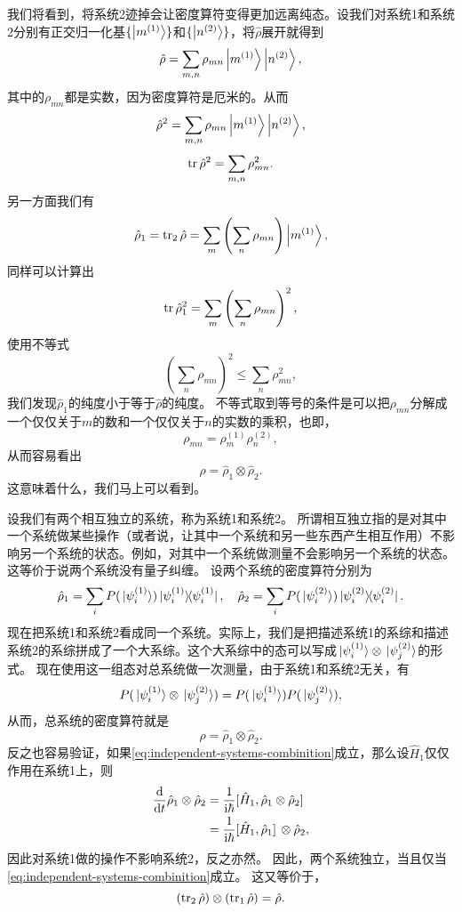 \documentclass[hyperref, UTF8, a4paper]{ctexart}
\newcommand*{\ii}{\mathrm{i}}
\begin{document}
我们将看到，将系统2迹掉会让密度算符变得更加远离纯态。设我们对系统1和系统2分别有正交归一化基$\{\ket{m^{(1)}}\}$和$\{\ket{n^{(2)}}\}$，将$\hat{\rho}$展开就得到
\[
    \hat{\rho} = \sum_{m,n} \rho_{mn} \ket{m^{(1)}} \ket{n^{(2)}},
\]
其中的$\rho_{mn}$都是实数，因为密度算符是厄米的。从而
\[
    \hat{\rho}^2 = \sum_{m,n} \rho_{mn} \ket{m^{(1)}} \ket{n^{(2)}},
\]
\[
    \trace \hat{\rho}^2 = \sum_{m,n} \rho_{mn}^2.
\]
另一方面我们有
\[
    \hat{\rho}_1 = \trace_2 \hat{\rho} = \sum_m \left(\sum_n \rho_{mn}\right) \ket{m^{(1)}},
\]
同样可以计算出
\[
    \trace \hat{\rho}_1^2 = \sum_m \left(\sum_n \rho_{mn}\right)^2,
\]
使用不等式
\[
    \left(\sum_n \rho_{mn}\right)^2 \leq \sum_n \rho_{mn}^2,
\]
我们发现$\hat{\rho}_1$的纯度小于等于$\hat{\rho}$的纯度。
不等式取到等号的条件是可以把$\rho_{mn}$分解成一个仅仅关于$m$的数和一个仅仅关于$n$的实数的乘积，也即，
\[
    \rho_{mn} = \rho^{(1)}_m \rho^{(2)}_n,
\]
从而容易看出
\[
    \hat{\rho} = \hat{\rho}_1 \otimes \hat{\rho}_2.
\]
这意味着什么，我们马上可以看到。

设我们有两个相互独立的系统，称为系统1和系统2。
所谓相互独立指的是对其中一个系统做某些操作（或者说，让其中一个系统和另一些东西产生相互作用）不影响另一个系统的状态。例如，对其中一个系统做测量不会影响另一个系统的状态。这等价于说两个系统没有量子纠缠。
设两个系统的密度算符分别为
\[
    \hat{\rho}_1 = \sum_i P(\ket*{\psi_i^{(1)}}) \dyad*{\psi_i^{(1)}}, \quad \hat{\rho}_2 = \sum_i P(\ket*{\psi_i^{(2)}}) \dyad*{\psi_i^{(2)}}.
\]
现在把系统1和系统2看成同一个系统。实际上，我们是把描述系统1的系综和描述系统2的系综拼成了一个大系综。这个大系综中的态可以写成$\ket*{\psi_i^{(1)}} \otimes \ket*{\psi_j^{(2)}}$的形式。
现在使用这一组态对总系统做一次测量，由于系统1和系统2无关，有
\[
    P(\ket*{\psi_i^{(1)}} \otimes \ket*{\psi_j^{(2)}}) = P(\ket*{\psi_i^{(1)}}) P(\ket*{\psi_j^{(2)}}),
\]
从而，总系统的密度算符就是
\begin{equation}
    \hat{\rho} = \hat{\rho}_1 \otimes \hat{\rho}_2.
    \label{eq:independent-systems-combinition}
\end{equation}
反之也容易验证，如果\eqref{eq:independent-systems-combinition}成立，那么设$\hat{H}_1$仅仅作用在系统1上，则
\[
    \begin{aligned}
        \dv{t} \hat{\rho}_1 \otimes \hat{\rho}_2 &= \frac{1}{\ii \hbar} \comm*{\hat{H}_1}{\hat{\rho}_1 \otimes \hat{\rho}_2} \\
        &= \frac{1}{\ii \hbar} \comm*{\hat{H}_1}{\hat{\rho}_1} \otimes \hat{\rho}_2,
    \end{aligned}
\]
因此对系统1做的操作不影响系统2，反之亦然。
因此，两个系统独立，当且仅当\eqref{eq:independent-systems-combinition}成立。
这又等价于，
\begin{equation}
    (\trace_2 \hat{\rho}) \otimes (\trace_1 \hat{\rho}) = \hat{\rho}.
\end{equation}
\end{document}
